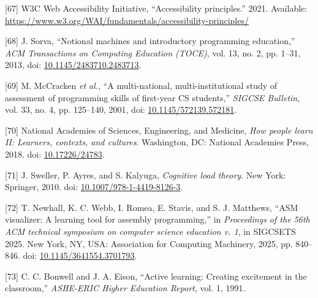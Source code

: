 \documentclass[12pt,oneside]{templates/unerthesis}
\newcommand{\CSLLeftMargin}[1]{#1} %
\newcommand{\CSLRightInline}[1]{#1} %
\newlength{\cslhangindent}
\newenvironment{CSLReferences}[2] %
 {\setlength{\parindent}{0pt}%
  \setlength{\leftskip}{#1 pt\relax}%
  \setlength{\parskip}{#2 pt\relax}%
  \everypar{\setlength{\hangindent}{\cslhangindent}}}
 {\par}
\begin{document}
\begin{CSLReferences}{0}{0}
\leavevmode{}%
\CSLLeftMargin{{[}67{]} }%
\CSLRightInline{W3C Web Accessibility Initiative, {``Accessibility principles.''} 2021. Available: \url{https://www.w3.org/WAI/fundamentals/accessibility-principles/}}

\leavevmode{}%
\CSLLeftMargin{{[}68{]} }%
\CSLRightInline{J. Sorva, {``Notional machines and introductory programming education,''} \emph{ACM Transactions on Computing Education (TOCE)}, vol. 13, no. 2, pp. 1--31, 2013, doi: \href{https://doi.org/10.1145/2483710.2483713}{10.1145/2483710.2483713}.}

\leavevmode{}%
\CSLLeftMargin{{[}69{]} }%
\CSLRightInline{M. McCracken \emph{et al.}, {``A multi-national, multi-institutional study of assessment of programming skills of first-year CS students,''} \emph{SIGCSE Bulletin}, vol. 33, no. 4, pp. 125--140, 2001, doi: \href{https://doi.org/10.1145/572139.572181}{10.1145/572139.572181}.}

\leavevmode{}%
\CSLLeftMargin{{[}70{]} }%
\CSLRightInline{National Academies of Sciences, Engineering, and Medicine, \emph{How people learn II: Learners, contexts, and cultures}. Washington, DC: National Academies Press, 2018. doi: \href{https://doi.org/10.17226/24783}{10.17226/24783}.}

\leavevmode{}%
\CSLLeftMargin{{[}71{]} }%
\CSLRightInline{J. Sweller, P. Ayres, and S. Kalyuga, \emph{Cognitive load theory}. New York: Springer, 2010. doi: \href{https://doi.org/10.1007/978-1-4419-8126-3}{10.1007/978-1-4419-8126-3}.}

\leavevmode{}%
\CSLLeftMargin{{[}72{]} }%
\CSLRightInline{T. Newhall, K. C. Webb, I. Romea, E. Stavis, and S. J. Matthews, {``ASM visualizer: A learning tool for assembly programming,''} in \emph{Proceedings of the 56th ACM technical symposium on computer science education v. 1}, in SIGCSETS 2025. New York, NY, USA: Association for Computing Machinery, 2025, pp. 840--846. doi: \href{https://doi.org/10.1145/3641554.3701793}{10.1145/3641554.3701793}.}

\leavevmode{}%
\CSLLeftMargin{{[}73{]} }%
\CSLRightInline{C. C. Bonwell and J. A. Eison, {``Active learning: Creating excitement in the classroom,''} \emph{ASHE-ERIC Higher Education Report}, vol. 1, 1991.}


\end{CSLReferences}
\end{document}
